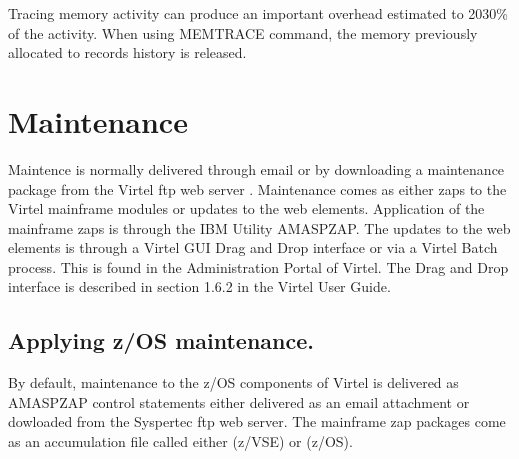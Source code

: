 \documentclass[letterpaper,10pt,english]{sphinxmanual}
\begin{document}
\sphinxAtStartPar
Tracing memory activity can produce an important overhead estimated to 20\sphinxhyphen{}30\% of the activity. When using MEMTRACE command, the memory previously allocated to records history is released.

\newpage
{}\label{\detokenize{audit_operations_ and_performance:v462ap-maintenance}}
\ignorespaces 
{}\ignorespaces 

\section{Maintenance}
\label{\detokenize{audit_operations_ and_performance:maintenance}}\label{\detokenize{audit_operations_ and_performance:index-44}}
\sphinxAtStartPar
Maintence is normally delivered through email or by downloading a maintenance package from the Virtel ftp web server \sphinxhyphen{} . Maintenance comes as either zaps to the Virtel mainframe modules or updates to the web elements. Application of the mainframe zaps is through the IBM Utility AMASPZAP. The updates to the web elements is through a Virtel GUI Drag and Drop interface or via a Virtel Batch process. This is found in the Administration Portal of Virtel. The Drag and Drop interface is described in section 1.6.2 in the Virtel User Guide.

\ignorespaces 

\subsection{Applying z/OS maintenance.}
\label{\detokenize{audit_operations_ and_performance:applying-z-os-maintenance}}\label{\detokenize{audit_operations_ and_performance:index-45}}
\sphinxAtStartPar
By default, maintenance to the z/OS components of Virtel is delivered as AMASPZAP control statements either delivered as an email attachment or dowloaded from the Syspertec ftp web server. The mainframe zap packages come as an accumulation file called either  (z/VSE) or  (z/OS).
\end{document}
